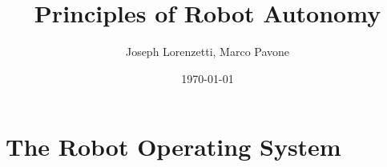 \documentclass[nohyper,nobib]{tufte-book}
\title{Principles of Robot Autonomy}
\author{Joseph Lorenzetti, Marco Pavone}
\date{\today}
\begin{document}
\chapter{The Robot Operating System}


\printbibliography
\end{document}
